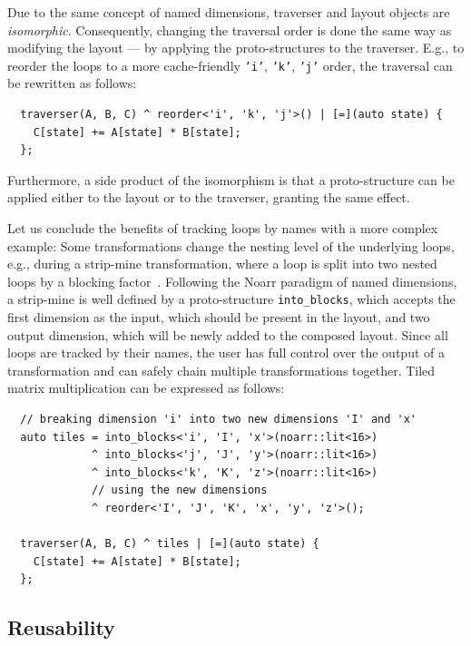 Due to the same concept of named dimensions, traverser and layout objects are \emph{isomorphic}. Consequently, changing the traversal order is done the same way as modifying the layout --- by applying the proto-structures to the traverser. E.g., to reorder the loops to a more cache-friendly \texttt{'i'}, \texttt{'k'}, \texttt{'j'} order, the traversal can be rewritten as follows:
\begin{verbatim}
  traverser(A, B, C) ^ reorder<'i', 'k', 'j'>() | [=](auto state) {
    C[state] += A[state] * B[state];
  };
\end{verbatim}
Furthermore, a side product of the isomorphism is that a proto-structure can be applied either to the layout or to the traverser, granting the same effect.

Let us conclude the benefits of tracking loops by names with a more complex example:
Some transformations change the nesting level of the underlying loops, e.g., during a strip-mine transformation, where a loop is split into two nested loops by a blocking factor~\cite{mckinley1996improving}. Following the Noarr paradigm of named dimensions, a strip-mine is well defined by a proto-structure \texttt{into_blocks}, which accepts the first dimension as the input, which should be present in the layout, and two output dimension, which will be newly added to the composed layout. Since all loops are tracked by their names, the user has full control over the output of a transformation and can safely chain multiple transformations together. Tiled matrix multiplication can be expressed as follows:
\begin{verbatim}
  // breaking dimension 'i' into two new dimensions 'I' and 'x'
  auto tiles = into_blocks<'i', 'I', 'x'>(noarr::lit<16>)
             ^ into_blocks<'j', 'J', 'y'>(noarr::lit<16>)
             ^ into_blocks<'k', 'K', 'z'>(noarr::lit<16>)
             // using the new dimensions
             ^ reorder<'I', 'J', 'K', 'x', 'y', 'z'>();

  traverser(A, B, C) ^ tiles | [=](auto state) {
    C[state] += A[state] * B[state];
  };
\end{verbatim}

\subsection{Reusability}

